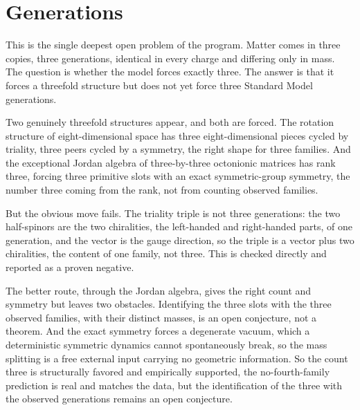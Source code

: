 \section{Generations}

This is the single deepest open problem of the program. Matter comes in three copies, three generations, identical in
every charge and differing only in mass. The question is whether the model forces exactly three. The answer is that
it forces a threefold structure but does not yet force three Standard Model generations.

Two genuinely threefold structures appear, and both are forced. The rotation structure of eight-dimensional space has
three eight-dimensional pieces cycled by triality, three peers cycled by a symmetry, the right shape for three families.
And the exceptional Jordan algebra of three-by-three octonionic matrices has rank three, forcing three primitive slots
with an exact symmetric-group symmetry, the number three coming from the rank, not from counting observed families.

But the obvious move fails. The triality triple is not three
generations: the two half-spinors are the two chiralities, the left-handed and right-handed parts, of one generation, and
the vector is the gauge direction, so the triple is a vector plus two chiralities, the content of one family, not three.
This is checked directly and reported as a proven negative.

The better route, through the Jordan algebra, gives the right count and symmetry but leaves two obstacles. Identifying the
three slots with the three observed families, with their distinct masses, is an open conjecture, not a theorem. And the
exact symmetry forces a degenerate vacuum, which a deterministic symmetric dynamics cannot spontaneously break, so the
mass splitting is a free external input carrying no geometric information. So the count three is structurally favored and
empirically supported, the no-fourth-family prediction is real and matches the data, but the identification of the three
with the observed generations remains an open conjecture.
